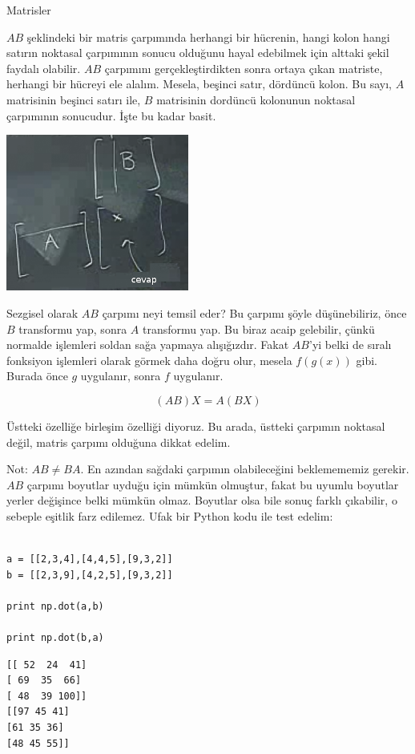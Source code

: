 \documentclass[12pt,fleqn]{article}\usepackage{../../common}
\begin{document}
Matrisler

$AB$ şeklindeki bir matris çarpımında herhangi bir hücrenin, hangi kolon hangi
satırın noktasal çarpımının sonucu olduğunu hayal edebilmek için alttaki şekil
faydalı olabilir. $AB$ çarpımını gerçekleştirdikten sonra ortaya çıkan matriste,
herhangi bir hücreyi ele alalım. Mesela, beşinci satır, dördüncü kolon. Bu sayı,
$A$ matrisinin beşinci satırı ile, $B$ matrisinin dordüncü kolonunun noktasal
çarpımının sonucudur. İşte bu kadar basit.

\includegraphics[width=6cm]{3_4.png}

Sezgisel olarak $AB$ çarpımı neyi temsil eder? Bu çarpımı şöyle düşünebiliriz,
önce $B$ transformu yap, sonra $A$ transformu yap. Bu biraz acaip gelebilir,
çünkü normalde işlemleri soldan sağa yapmaya alışığızdır. Fakat $AB$'yi belki de
sıralı fonksiyon işlemleri olarak görmek daha doğru olur, mesela $f(g(x))$
gibi. Burada önce $g$ uygulanır, sonra $f$ uygulanır.

$$ (AB)X = A(BX) $$

Üstteki özelliğe birleşim özelliği diyoruz. Bu arada, üstteki çarpımın noktasal
değil, matris çarpımı olduğuna dikkat edelim.

Not: $AB \ne BA$. En azından sağdaki çarpımın olabileceğini beklemememiz
gerekir. $AB$ çarpımı boyutlar uyduğu için mümkün olmuştur, fakat bu uyumlu
boyutlar yerler değişince belki mümkün olmaz. Boyutlar olsa bile sonuç farklı
çıkabilir, o sebeple eşitlik farz edilemez. Ufak bir Python kodu ile test
edelim:

\begin{verbatim}

a = [[2,3,4],[4,4,5],[9,3,2]]
b = [[2,3,9],[4,2,5],[9,3,2]]

print np.dot(a,b)

print np.dot(b,a)
\end{verbatim}

\begin{verbatim}
[[ 52  24  41]
[ 69  35  66]
[ 48  39 100]]
[[97 45 41]
[61 35 36]
[48 45 55]]
\end{verbatim}
\end{document}
